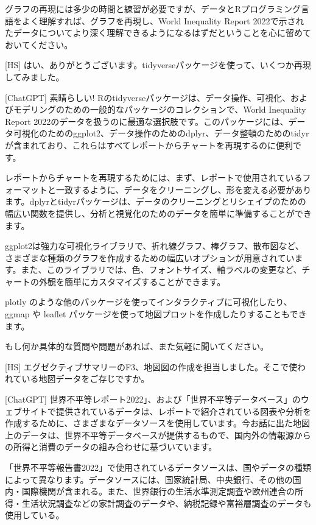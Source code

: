 \documentclass[
]{book}
\theoremstyle{definition}
\theoremstyle{definition}
\theoremstyle{definition}
\theoremstyle{definition}
\theoremstyle{remark}
\begin{document}
グラフの再現には多少の時間と練習が必要ですが、データとRプログラミング言語をよく理解すれば、グラフを再現し、World Inequality Report 2022で示されたデータについてより深く理解できるようになるはずだということを心に留めておいてください。

{[}HS{]} はい、ありがとうございます。tidyverseパッケージを使って、いくつか再現してみました。

{[}ChatGPT{]} 素晴らしい! Rのtidyverseパッケージは、データ操作、可視化、およびモデリングのための一般的なパッケージのコレクションで、World Inequality Report 2022のデータを扱うのに最適な選択肢です。このパッケージには、データ可視化のためのggplot2、データ操作のためのdplyr、データ整頓のためのtidyrが含まれており、これらはすべてレポートからチャートを再現するのに便利です。

レポートからチャートを再現するためには、まず、レポートで使用されているフォーマットと一致するように、データをクリーニングし、形を変える必要があります。dplyrとtidyrパッケージは、データのクリーニングとリシェイプのための幅広い関数を提供し、分析と視覚化のためのデータを簡単に準備することができます。

ggplot2は強力な可視化ライブラリで、折れ線グラフ、棒グラフ、散布図など、さまざまな種類のグラフを作成するための幅広いオプションが用意されています。また、このライブラリでは、色、フォントサイズ、軸ラベルの変更など、チャートの外観を簡単にカスタマイズすることができます。

plotly のような他のパッケージを使ってインタラクティブに可視化したり、ggmap や leaflet パッケージを使って地図プロットを作成したりすることもできます。

もし何か具体的な質問や問題があれば、また気軽に聞いてください。

{[}HS{]} エグゼクティブサマリーのF3、地図図の作成を担当しました。そこで使われている地図データをご存じですか。

{[}ChatGPT{]} 世界不平等レポート2022」、および「世界不平等データベース」のウェブサイトで提供されているデータは、レポートで紹介されている図表や分析を作成するために、さまざまなデータソースを使用しています。今お話に出た地図上のデータは、世界不平等データベースが提供するもので、国内外の情報源からの所得と消費のデータの組み合わせに基づいています。

「世界不平等報告書2022」で使用されているデータソースは、国やデータの種類によって異なります。データソースには、国家統計局、中央銀行、その他の国内・国際機関が含まれる。また、世界銀行の生活水準測定調査や欧州連合の所得・生活状況調査などの家計調査のデータや、納税記録や富裕層調査のデータも使用している。
\end{document}

